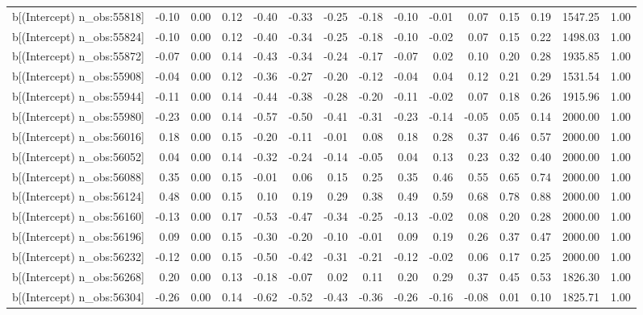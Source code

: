 \begin{table}[ht]
\begin{tabular}{rrrrrrrrrrrrrrr}
  b[(Intercept) n\_obs:55818] & -0.10 & 0.00 & 0.12 & -0.40 & -0.33 & -0.25 & -0.18 & -0.10 & -0.01 & 0.07 & 0.15 & 0.19 & 1547.25 & 1.00 \\ 
  b[(Intercept) n\_obs:55824] & -0.10 & 0.00 & 0.12 & -0.40 & -0.34 & -0.25 & -0.18 & -0.10 & -0.02 & 0.07 & 0.15 & 0.22 & 1498.03 & 1.00 \\ 
  b[(Intercept) n\_obs:55872] & -0.07 & 0.00 & 0.14 & -0.43 & -0.34 & -0.24 & -0.17 & -0.07 & 0.02 & 0.10 & 0.20 & 0.28 & 1935.85 & 1.00 \\ 
  b[(Intercept) n\_obs:55908] & -0.04 & 0.00 & 0.12 & -0.36 & -0.27 & -0.20 & -0.12 & -0.04 & 0.04 & 0.12 & 0.21 & 0.29 & 1531.54 & 1.00 \\ 
  b[(Intercept) n\_obs:55944] & -0.11 & 0.00 & 0.14 & -0.44 & -0.38 & -0.28 & -0.20 & -0.11 & -0.02 & 0.07 & 0.18 & 0.26 & 1915.96 & 1.00 \\ 
  b[(Intercept) n\_obs:55980] & -0.23 & 0.00 & 0.14 & -0.57 & -0.50 & -0.41 & -0.31 & -0.23 & -0.14 & -0.05 & 0.05 & 0.14 & 2000.00 & 1.00 \\ 
  b[(Intercept) n\_obs:56016] & 0.18 & 0.00 & 0.15 & -0.20 & -0.11 & -0.01 & 0.08 & 0.18 & 0.28 & 0.37 & 0.46 & 0.57 & 2000.00 & 1.00 \\ 
  b[(Intercept) n\_obs:56052] & 0.04 & 0.00 & 0.14 & -0.32 & -0.24 & -0.14 & -0.05 & 0.04 & 0.13 & 0.23 & 0.32 & 0.40 & 2000.00 & 1.00 \\ 
  b[(Intercept) n\_obs:56088] & 0.35 & 0.00 & 0.15 & -0.01 & 0.06 & 0.15 & 0.25 & 0.35 & 0.46 & 0.55 & 0.65 & 0.74 & 2000.00 & 1.00 \\ 
  b[(Intercept) n\_obs:56124] & 0.48 & 0.00 & 0.15 & 0.10 & 0.19 & 0.29 & 0.38 & 0.49 & 0.59 & 0.68 & 0.78 & 0.88 & 2000.00 & 1.00 \\ 
  b[(Intercept) n\_obs:56160] & -0.13 & 0.00 & 0.17 & -0.53 & -0.47 & -0.34 & -0.25 & -0.13 & -0.02 & 0.08 & 0.20 & 0.28 & 2000.00 & 1.00 \\ 
  b[(Intercept) n\_obs:56196] & 0.09 & 0.00 & 0.15 & -0.30 & -0.20 & -0.10 & -0.01 & 0.09 & 0.19 & 0.26 & 0.37 & 0.47 & 2000.00 & 1.00 \\ 
  b[(Intercept) n\_obs:56232] & -0.12 & 0.00 & 0.15 & -0.50 & -0.42 & -0.31 & -0.21 & -0.12 & -0.02 & 0.06 & 0.17 & 0.25 & 2000.00 & 1.00 \\ 
  b[(Intercept) n\_obs:56268] & 0.20 & 0.00 & 0.13 & -0.18 & -0.07 & 0.02 & 0.11 & 0.20 & 0.29 & 0.37 & 0.45 & 0.53 & 1826.30 & 1.00 \\ 
  b[(Intercept) n\_obs:56304] & -0.26 & 0.00 & 0.14 & -0.62 & -0.52 & -0.43 & -0.36 & -0.26 & -0.16 & -0.08 & 0.01 & 0.10 & 1825.71 & 1.00 \\ 

\end{tabular}
\end{table}
